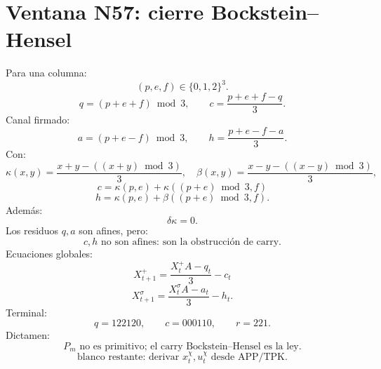 
\section*{Ventana N57: cierre Bockstein--Hensel}
Para una columna:
\[
(p,e,f)\in\{0,1,2\}^3.
\]
\[
q=(p+e+f)\bmod3,
\qquad
c=\frac{p+e+f-q}{3}.
\]
Canal firmado:
\[
a=(p+e-f)\bmod3,
\qquad
h=\frac{p+e-f-a}{3}.
\]
Con:
\[
\kappa(x,y)=\frac{x+y-((x+y)\bmod3)}{3},
\quad
\beta(x,y)=\frac{x-y-((x-y)\bmod3)}{3},
\]
\[
\boxed{c=\kappa(p,e)+\kappa((p+e)\bmod3,f)}
\]
\[
\boxed{h=\kappa(p,e)+\beta((p+e)\bmod3,f)}.
\]
Además:
\[
\delta\kappa=0.
\]
Los residuos \(q,a\) son afines, pero:
\[
\boxed{c,h\text{ no son afines: son la obstrucción de carry.}}
\]
Ecuaciones globales:
\[
\boxed{X_{t+1}^+=\frac{X_t^+A-q_t}{3}-c_t}
\]
\[
\boxed{X_{t+1}^\sigma=\frac{X_t^\sigma A-a_t}{3}-h_t}.
\]
Terminal:
\[
q=122120,\qquad c=000110,\qquad r=221.
\]
Dictamen:
\[
\boxed{P_m\text{ no es primitivo; el carry Bockstein--Hensel es la ley.}}
\]
\[
\boxed{\text{blanco restante: derivar }x_t^\chi,u_t^\chi\text{ desde APP/TPK.}}
\]
